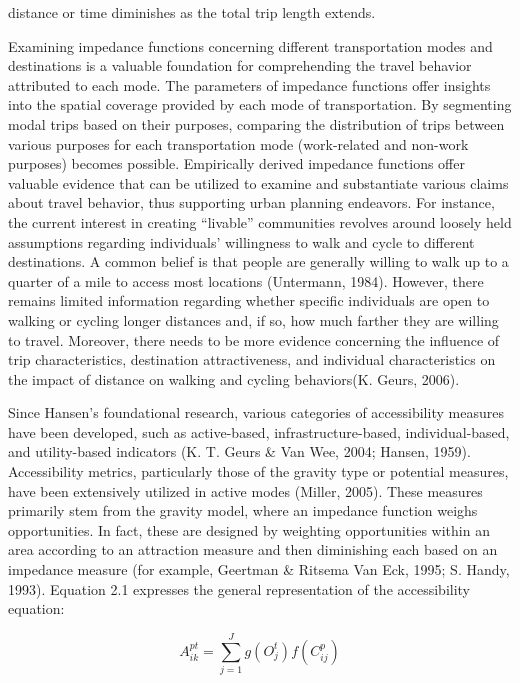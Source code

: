 \documentclass[
11pt, %
oneside, %
english, %
singlespacing, %
]{macthesis} %
\begin{document}
distance or time diminishes as the total trip length extends.

Examining impedance functions concerning different transportation modes and destinations is a valuable foundation for comprehending the travel behavior attributed to each mode. The parameters of impedance functions offer insights into the spatial coverage provided by each mode of transportation. By segmenting modal trips based on their purposes, comparing the distribution of trips between various purposes for each transportation mode (work-related and non-work purposes) becomes possible. Empirically derived impedance functions offer valuable evidence that can be utilized to examine and substantiate various claims about travel behavior, thus supporting urban planning endeavors. For instance, the current interest in creating ``livable'' communities revolves around loosely held assumptions regarding individuals' willingness to walk and cycle to different destinations. A common belief is that people are generally willing to walk up to a quarter of a mile to access most locations (Untermann, 1984). However, there remains limited information regarding whether specific individuals are open to walking or cycling longer distances and, if so, how much farther they are willing to travel. Moreover, there needs to be more evidence concerning the influence of trip characteristics, destination attractiveness, and individual characteristics on the impact of distance on walking and cycling behaviors(K. Geurs, 2006).

Since Hansen's foundational research, various categories of accessibility measures have been developed, such as active-based, infrastructure-based, individual-based, and utility-based indicators (K. T. Geurs \& Van Wee, 2004; Hansen, 1959). Accessibility metrics, particularly those of the gravity type or potential measures, have been extensively utilized in active modes (Miller, 2005). These measures primarily stem from the gravity model, where an impedance function weighs opportunities. In fact, these are designed by weighting opportunities within an area according to an attraction measure and then diminishing each based on an impedance measure (for example, Geertman \& Ritsema Van Eck, 1995; S. Handy, 1993). Equation 2.1 expresses the general representation of the accessibility equation:

\begin{equation}
A_{ik}^{pt} = \sum_{j=1}^J g(O_j^t) f(C_{ij}^p)
\label{eq:gen}
\end{equation}
\end{document}
